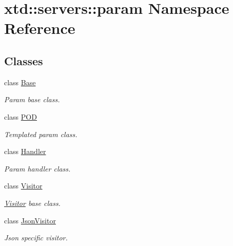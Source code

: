 \hypertarget{namespacextd_1_1servers_1_1param}{\section{xtd\-:\-:servers\-:\-:param Namespace Reference}
\label{namespacextd_1_1servers_1_1param}
}
\subsection*{Classes}
\begin{DoxyCompactItemize}
\item 
class \hyperlink{classxtd_1_1servers_1_1param_1_1Base}{Base}
\begin{DoxyCompactList}\small\item\em Param base class. \end{DoxyCompactList}\item 
class \hyperlink{classxtd_1_1servers_1_1param_1_1POD}{P\-O\-D}
\begin{DoxyCompactList}\small\item\em Templated param class. \end{DoxyCompactList}\item 
class \hyperlink{classxtd_1_1servers_1_1param_1_1Handler}{Handler}
\begin{DoxyCompactList}\small\item\em Param handler class. \end{DoxyCompactList}\item 
class \hyperlink{classxtd_1_1servers_1_1param_1_1Visitor}{Visitor}
\begin{DoxyCompactList}\small\item\em \hyperlink{classxtd_1_1servers_1_1param_1_1Visitor}{Visitor} base class. \end{DoxyCompactList}\item 
class \hyperlink{classxtd_1_1servers_1_1param_1_1JsonVisitor}{Json\-Visitor}
\begin{DoxyCompactList}\small\item\em Json specific visitor. \end{DoxyCompactList}\end{DoxyCompactItemize}
